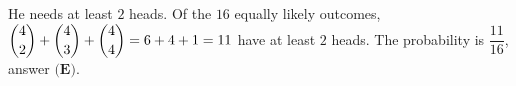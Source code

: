He needs at least $2$ heads. Of the $16$ equally likely outcomes, $\dbinom42+\dbinom43+\dbinom44=6+4+1=11$ have at least $2$ heads. The probability is $\boxed{\dfrac{11}{16}}$, answer $\textbf{(E)}$.
